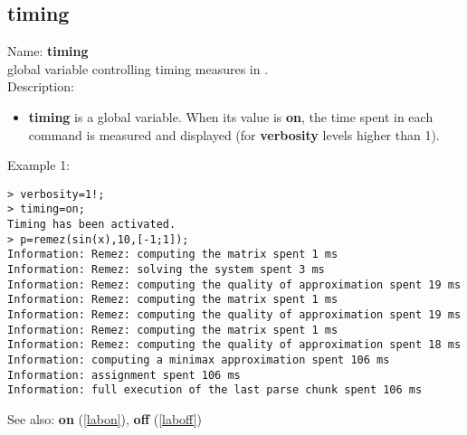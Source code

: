 \subsection{timing}
\label{labtiming}
\noindent Name: \textbf{timing}\\
global variable controlling timing measures in \sollya.\\

\noindent Description: \begin{itemize}

\item \textbf{timing} is a global variable. When its value is \textbf{on}, the time spent in each 
   command is measured and displayed (for \textbf{verbosity} levels higher than 1).
\end{itemize}
\noindent Example 1: 
\begin{center}\begin{minipage}{15cm}\begin{Verbatim}[frame=single]
> verbosity=1!;
> timing=on;
Timing has been activated.
> p=remez(sin(x),10,[-1;1]);
Information: Remez: computing the matrix spent 1 ms
Information: Remez: solving the system spent 3 ms
Information: Remez: computing the quality of approximation spent 19 ms
Information: Remez: computing the matrix spent 1 ms
Information: Remez: computing the quality of approximation spent 19 ms
Information: Remez: computing the matrix spent 1 ms
Information: Remez: computing the quality of approximation spent 18 ms
Information: computing a minimax approximation spent 106 ms
Information: assignment spent 106 ms
Information: full execution of the last parse chunk spent 106 ms
\end{Verbatim}
\end{minipage}\end{center}
See also: \textbf{on} (\ref{labon}), \textbf{off} (\ref{laboff})
